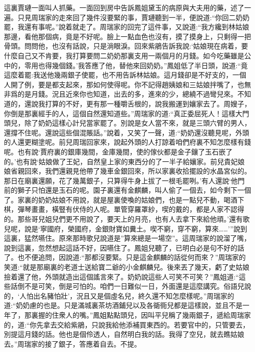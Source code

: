 \begin{parag}
    這裏賈璉一面叫人抓藥。一面回到房中告訴鳳姐黛玉的病原與大夫用的藥，述了一遍。只見周瑞家的走來回了幾件沒要緊的事，賈璉聽到一半，便說道:“你回二奶奶罷，我還有事呢。”說着就走了。周瑞家的回完了這件事，又說道:“我方纔到林姑娘那邊，看他那個病，竟是不好呢。臉上一點血色也沒有，摸了摸身上，只剩得一把骨頭。問問他，也沒有話說，只是淌眼淚。回來紫鵑告訴我說:‘姑娘現在病着，要什麼自己又不肯要，我打算要問二奶奶那裏支用一兩個月的月錢。如今吃藥雖是公中的，零用也得幾個錢。’我答應了他，替他來回奶奶。”鳳姐低了半日頭，說道:“竟這麼着罷:我送他幾兩銀子使罷，也不用告訴林姑娘。這月錢卻是不好支的，一個人開了例，要是都支起來，那如何使得呢。你不記得趙姨娘和三姑娘拌嘴了，也無非爲的是月錢。況且近來你也知道，出去的多，進來的少，總繞不過彎兒來。不知道的，還說我打算的不好，更有那一種嚼舌根的，說我搬運到孃家去了。周嫂子，你倒是那裏經手的人，這個自然還知道些。”周瑞家的道:“真正委屈死人！這樣大門頭兒，除了奶奶這樣心計兒當家罷了。別說是女人當不來，就是三頭六臂的男人，還撐不住呢。還說這些個混賬話。”說着，又笑了一聲，道:“奶奶還沒聽見呢，外頭的人還更糊塗呢。前兒周瑞回家來，說起外頭的人打諒着咱們府裏不知怎麼樣有錢呢。也有說‘賈府裏的銀庫幾間，金庫幾間，使的傢伙都是金子鑲了玉石嵌了的。’也有說‘姑娘做了王妃，自然皇上家的東西分的了一半子給孃家。前兒貴妃娘娘省親回來，我們還親見他帶了幾車金銀回來，所以家裏收拾擺設的水晶宮似的。那日在廟裏還願，花了幾萬銀子，只算得牛身上拔了一根毛罷咧。’有人還說‘他門前的獅子只怕還是玉石的呢。園子裏還有金麒麟，叫人偷了一個去，如今剩下一個了。家裏的奶奶姑娘不用說，就是屋裏使喚的姑娘們，也是一點兒不動，喝酒下棋，彈琴畫畫，橫豎有伏侍的人呢。單管穿羅罩紗，喫的戴的，都是人家不認得的。那些哥兒姐兒們更不用說了，要天上的月亮，也有人去拿下來給他頑。’還有歌兒呢，說是‘寧國府，榮國府，金銀財寶如糞土。喫不窮，穿不窮，算來……’”說到這裏，猛然嚥住。原來那時歌兒說道是”算來總是一場空”。這周瑞家的說溜了嘴，說到這裏，忽然想起這話不好，因嚥住了。鳳姐兒聽了，已明白必是句不好的話了。也不便追問，因說道:“那都沒要緊。只是這金麒麟的話從何而來？”周瑞家的笑道:“就是那廟裏的老道士送給寶二爺的小金麒麟兒。後來丟了幾天，虧了史姑娘撿着還了他，外頭就造出這個謠言來了。奶奶說這些人可笑不可笑？”鳳姐道:“這些話倒不是可笑，倒是可怕的。咱們一日難似一日，外面還是這麼講究。俗語兒說的，‘人怕出名豬怕壯’，況且又是個虛名兒，終久還不知怎麼樣呢。”周瑞家的道:“奶奶慮的也是。只是滿城裏茶坊酒鋪兒以及各衚衕兒都是這樣說，並且不是一年了，那裏握的住衆人的嘴。”鳳姐點點頭兒，因叫平兒稱了幾兩銀子，遞給周瑞家的，道:“你先拿去交給紫鵑，只說我給他添補買東西的。若要官中的，只管要去，別提這月錢的話。他也是個伶透人，自然明白我的話。我得了空兒，就去瞧姑娘去。”周瑞家的接了銀子，答應着自去。不提。
\end{parag}


